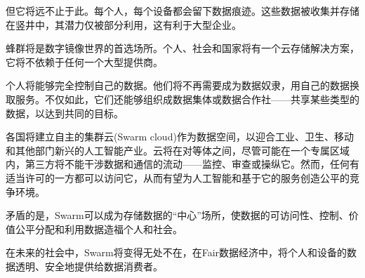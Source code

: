 但它将远不止于此。每个人，每个设备都会留下数据痕迹。这些数据被收集并存储在竖井中，其潜力仅被部分利用，这有利于大型企业。

蜂群将是数字镜像世界的首选场所。个人、社会和国家将有一个云存储解决方案，它将不依赖于任何一个大型提供商。 


个人将能够完全控制自己的数据。他们将不再需要成为数据奴隶，用自己的数据换取服务。不仅如此，它们还能够组织成数据集体或数据合作社——共享某些类型的数据，以达到共同的目标。

各国将建立自主的集群云(Swarm cloud)作为数据空间，以迎合工业、卫生、移动和其他部门新兴的人工智能产业。云将在对等体之间，尽管可能在一个专属区域内，第三方将不能干涉数据和通信的流动——监控、审查或操纵它。然而，任何有适当许可的一方都可以访问它，从而有望为人工智能和基于它的服务创造公平的竞争环境。

矛盾的是，Swarm可以成为存储数据的“中心”场所，使数据的可访问性、控制、价值公平分配和利用数据造福个人和社会。

在未来的社会中，Swarm将变得无处不在，在Fair数据经济中，将个人和设备的数据透明、安全地提供给数据消费者。

